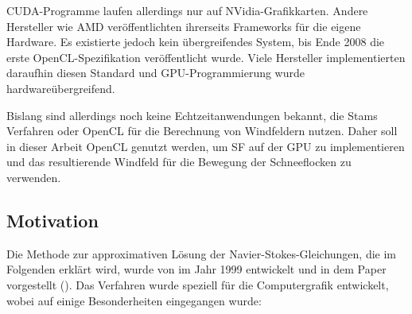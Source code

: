 CUDA-Programme laufen allerdings nur auf NVidia-Grafikkarten. Andere
Hersteller wie AMD veröffentlichten ihrerseits Frameworks für die
eigene Hardware. Es existierte jedoch kein übergreifendes System, bis Ende
2008 die erste OpenCL-Spezifikation veröffentlicht wurde. Viele
Hersteller implementierten daraufhin diesen Standard und
GPU-Programmierung wurde hardwareübergreifend.

Bislang sind allerdings noch keine Echtzeitanwendungen bekannt, die
Stams Verfahren oder OpenCL für die Berechnung von Windfeldern
nutzen. Daher soll in dieser Arbeit OpenCL genutzt werden, um SF auf
der GPU zu implementieren und das resultierende Windfeld für die
Bewegung der Schneeflocken zu verwenden.

\subsection{Motivation}

Die Methode zur approximativen Lösung der Navier-Stokes-Gleichungen,
die im Folgenden erklärt wird, wurde von  im
Jahr 1999 entwickelt und in dem Paper 
vorgestellt (\cite{Stam1999}). Das Verfahren wurde speziell für die
Computergrafik entwickelt, wobei auf einige Besonderheiten eingegangen
wurde:

